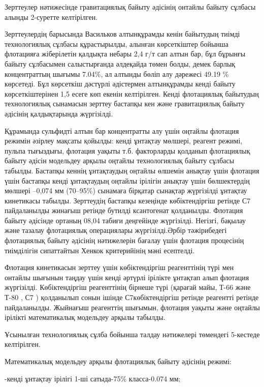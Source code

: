 \begin{multicols}{2}

Зерттеулер нәтижесінде гравитациялық байыту әдісінің онтайлы байыту
сұлбасы алынды 2-суретте келтірілген.

Зерттеулердің барысында Васильков алтынқұрамды кенін байытудың тиімді
технологиялық сұлбасы құрастырылды, алынған көрсеткіштер бойынша
флотацияға жіберілетін қалдықта небары 2,4 г/т сап алтын бар, бұл
бұрынғы байыту сұлбасымен салыстырғанда әлдеқайда төмен болды, демек
барлық концентраттың шығымы 7.04\%, ал алтынды бөліп алу дәрежесі 49.19
\% көрсетеді. Бұл көрсеткіш дәстүрлі әдістермен алтынқұрамды кенді
байыту көрсеткіштерінен 1,5 есеге көп екенін келтірілген. Кенді
флотациялық байытудың технологиялық сынамасын зерттеу бастапқы кен және
гравитациялық байыту әдісінің қалдықтарында жүргізілді.

Құрамында сульфидті алтын бар концентратты алу үшін оңтайлы флотация
режимін әзірлеу мақсаты қойылды: кенді ұнтақтау мөлшері, реагент режимі,
пульпа тығыздығы, флотация уақыты т.б. факторларды қолданып флотациялық
байыту әдісін модельдеу арқылы оңтайлы технологиялық байыту сұлбасы
табылды. Бастапқы кеннің ұнтақтаудың оңтайлы өлшемін анықтау үшін
флотация үшін бастапқы кенді ұнтақтаудың оңтайлы ірілігін анықтау үшін
бөлшектердің мөлшері --0,074 мм (70--95\%) сынамаға бірқатар сынақтар
жүргізілді ұнтақтау кинетикасы табылды. Зерттеудің бастапқы кезеңінде
көбіктендіргіш ретінде С7 пайдаланылды жинағыш ретінде бутилді
ксантогенат қолданылды. Флотация байыту әдісінде ортаның 08,04 табиғи
деңгейінде жүргізілді. Негізгі, бақылау және тазалау флотациялық
операциялары жүргізілді.Әрбір тәжірибедегі флотациялық байыту әдісінің
нәтижелерін бағалау үшін флотация процесінің тиімділігін сипаттайтын
Хенкок критерийінің мәні есептелді.

Флотация кинетикасын зерттеу үшін көбіктендіргіш реагенттінің түрі мен
онтайлы шығынын таңдау үшін кенді әртүрлі ірілікте ұнтақтап алып
флотация жүргізілді. Көбіктендіргіш реагенттінің бірнеше түрі (қарағай
майы, Т-66 және Т-80 , С7 ) қолданылып сонын ішінде С7көбіктендіргіш
ретінде реагентті ретінде пайдаланылды. Жыйнағыш реагенттің шығымын,
флотация уақыты және оңтайлы ірілікті математикалық модельдеу арқылы
табылды.

Ұсынылған технологиялық сұлба бойынша талдау нәтижелері төмендегі
5-кестеде келтірілген.

Математикалық модельдеу арқылы флотациялық байыту әдісінің режимі:

-кенді ұнтақтау ірілігі 1-ші сатыда-75\% класса-0.074 мм;


\end{multicols}
